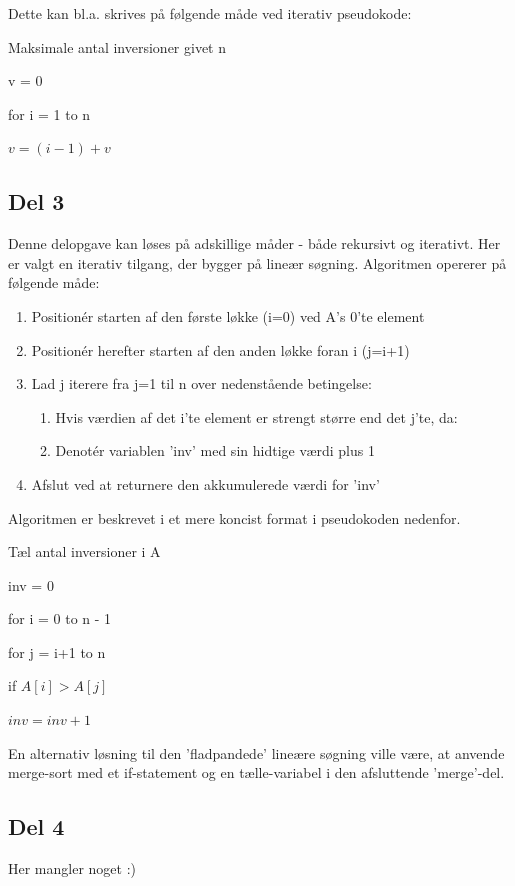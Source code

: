 \documentclass[a4paper,10pt]{article}
\begin{document}
Dette kan bl.a. skrives på følgende måde ved iterativ pseudokode:

\begin{algorithm}
\caption{Maksimale antal inversioner givet n}
\begin{algorithmic}[1]
\State \parbox[t]{.7\linewidth}{v = 0}
\State \parbox[t]{.7\linewidth}{for i = 1 to n}
\Indent
\State \parbox[t]{.7\linewidth}{$v = (i-1) + v$}
\EndIndent
\State {}
\EndFunction
\end{algorithmic}
\end{algorithm}

\subsection*{Del 3}

Denne delopgave kan løses på adskillige måder - både rekursivt og iterativt. Her er valgt en iterativ tilgang, der bygger på lineær søgning. Algoritmen opererer på følgende måde:

\begin{enumerate}
\item{Positionér starten af den første løkke (i=0) ved A's 0'te element}
\item{Positionér herefter starten af den anden løkke foran i (j=i+1)}
\item{Lad j iterere fra j=1 til n over nedenstående betingelse:}
\begin{enumerate}
\item{Hvis værdien af det i'te element er strengt større end det j'te, da:}
\item{Denotér variablen 'inv' med sin hidtige værdi plus 1}
\end{enumerate}
\item{Afslut ved at returnere den akkumulerede værdi for 'inv'}
\end{enumerate}

\pagebreak

Algoritmen er beskrevet i et mere koncist format i pseudokoden nedenfor. 

\begin{algorithm}
\caption{Tæl antal inversioner i A}
\begin{algorithmic}[2]
\State \parbox[t]{.7\linewidth}{inv = 0}
\State \parbox[t]{.7\linewidth}{for i = 0 to n - 1}
\Indent
\State \parbox[t]{.7\linewidth}{for j = i+1 to n}
\Indent
\State \parbox[t]{.7\linewidth}{if $A[i] > A[j]$}
\State \parbox[t]{.7\linewidth}{$inv = inv + 1$}
\EndIndent
\EndIndent
\State {}
\EndFunction
\end{algorithmic}
\end{algorithm}

En alternativ løsning til den 'fladpandede' lineære søgning ville være, at anvende merge-sort med et if-statement og en tælle-variabel i den afsluttende 'merge'-del.

\subsection*{Del 4}

Her mangler noget :)
\end{document}
